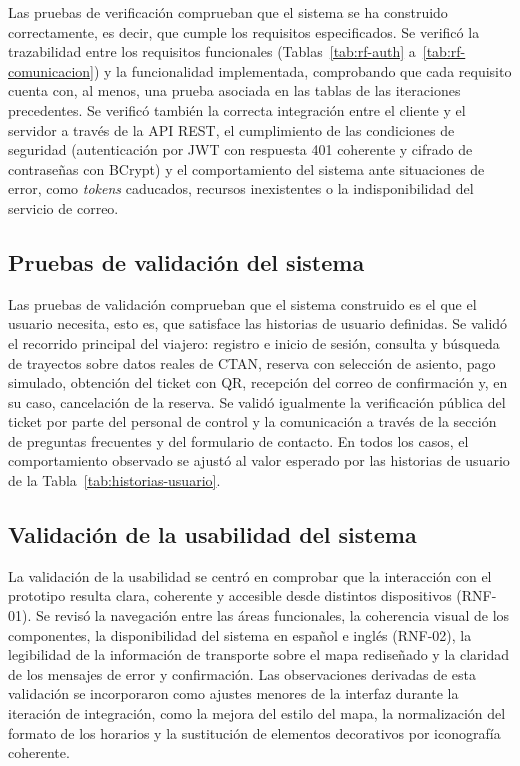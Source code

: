 Las pruebas de verificación comprueban que el sistema se ha construido correctamente, es decir, que cumple los requisitos especificados. Se verificó la trazabilidad entre los requisitos funcionales (Tablas~\ref{tab:rf-auth} a~\ref{tab:rf-comunicacion}) y la funcionalidad implementada, comprobando que cada requisito cuenta con, al menos, una prueba asociada en las tablas de las iteraciones precedentes. Se verificó también la correcta integración entre el cliente y el servidor a través de la API REST, el cumplimiento de las condiciones de seguridad (autenticación por JWT con respuesta 401 coherente y cifrado de contraseñas con BCrypt) y el comportamiento del sistema ante situaciones de error, como \textit{tokens} caducados, recursos inexistentes o la indisponibilidad del servicio de correo.


\subsection{Pruebas de validación del sistema}

Las pruebas de validación comprueban que el sistema construido es el que el usuario necesita, esto es, que satisface las historias de usuario definidas. Se validó el recorrido principal del viajero: registro e inicio de sesión, consulta y búsqueda de trayectos sobre datos reales de CTAN, reserva con selección de asiento, pago simulado, obtención del ticket con QR, recepción del correo de confirmación y, en su caso, cancelación de la reserva. Se validó igualmente la verificación pública del ticket por parte del personal de control y la comunicación a través de la sección de preguntas frecuentes y del formulario de contacto. En todos los casos, el comportamiento observado se ajustó al valor esperado por las historias de usuario de la Tabla~\ref{tab:historias-usuario}.


\subsection{Validación de la usabilidad del sistema}

La validación de la usabilidad se centró en comprobar que la interacción con el prototipo resulta clara, coherente y accesible desde distintos dispositivos (RNF-01). Se revisó la navegación entre las áreas funcionales, la coherencia visual de los componentes, la disponibilidad del sistema en español e inglés (RNF-02), la legibilidad de la información de transporte sobre el mapa rediseñado y la claridad de los mensajes de error y confirmación. Las observaciones derivadas de esta validación se incorporaron como ajustes menores de la interfaz durante la iteración de integración, como la mejora del estilo del mapa, la normalización del formato de los horarios y la sustitución de elementos decorativos por iconografía coherente.
